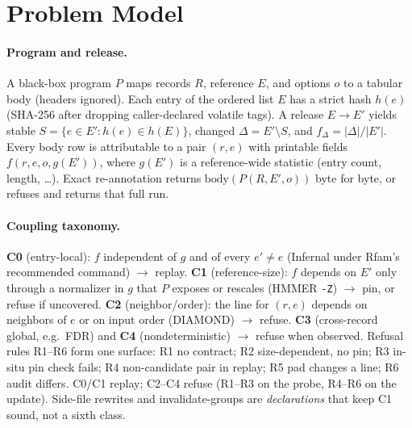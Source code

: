 \section{Problem Model}
\label{sec:model}

\paragraph{Program and release.}
A black-box program $P$ maps records $R$, reference $E$, and options $o$ to a
tabular body (headers ignored). Each entry of the ordered list $E$ has a strict
hash $h(e)$ (SHA-256 after dropping caller-declared volatile tags). A release
$E\!\to\!E'$ yields stable $S=\{e\in E':h(e)\in h(E)\}$, changed
$\Delta=E'\setminus S$, and $f_\Delta=|\Delta|/|E'|$.
Every body row is attributable to a pair $(r,e)$ with printable fields
$f(r,e,o,g(E'))$, where $g(E')$ is a reference-wide statistic (entry count,
length, \ldots). Exact re-annotation returns $\mathrm{body}(P(R,E',o))$ byte for
byte, or refuses and returns that full run.

\paragraph{Coupling taxonomy.}
\textbf{C0} (entry-local): $f$ independent of $g$ and of every $e'\neq e$
(Infernal under Rfam's recommended command) $\rightarrow$ replay.
\textbf{C1} (reference-size): $f$ depends on $E'$ only through a normalizer in
$g$ that $P$ exposes or \sys rescales (HMMER \texttt{-Z}) $\rightarrow$ pin, or
refuse if uncovered.
\textbf{C2} (neighbor/order): the line for $(r,e)$ depends on neighbors of $e$
or on input order (DIAMOND) $\rightarrow$ refuse.
\textbf{C3} (cross-record global, e.g.\ FDR) and \textbf{C4} (nondeterministic)
$\rightarrow$ refuse when observed.
Refusal rules R1--R6 form one surface: R1 no contract; R2 size-dependent, no
pin; R3 in-situ pin check fails; R4 non-candidate pair in replay; R5 pad changes
a line; R6 audit differs. C0/C1 replay; C2--C4 refuse (R1--R3 on the probe,
R4--R6 on the update). Side-file rewrites and invalidate-groups are
\textit{declarations} that keep C1 sound, not a sixth class.

